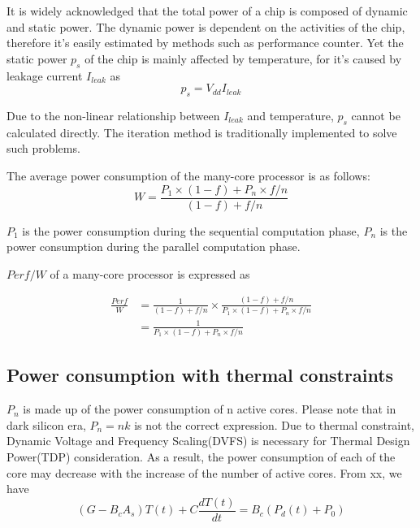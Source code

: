 It is widely acknowledged that the total power of a chip is composed of dynamic and 
static power. The dynamic power is dependent on the activities of the chip, therefore it's 
easily estimated by methods such as performance counter.
Yet the static power $p_{s}$ of the chip is mainly affected by temperature, for it's caused by
leakage current $I_{leak}$ as
\begin{equation}\label{ps}
p_{s} = V_{dd}I_{leak}
\end{equation}

Due to the non-linear relationship between $I_{leak}$ and temperature, $p_{s}$ cannot be
calculated directly. The iteration method is traditionally implemented to solve such problems.







The average power consumption of the many-core processor is as follows:
\begin{equation}\label{average_power}
W = \frac{P_{1} \times (1-f)+P_{n} \times f/n}{(1-f)+f/n}
\end{equation}

$P_{1}$ is the power consumption during the sequential computation phase, $P_{n}$ is the power 
consumption during the parallel computation phase. 

$Perf/W$ of a many-core processor is expressed as

\begin{equation}\label{ppw}
\begin{split}
\frac{Perf}{W} &= \frac{1}{(1-f)+f/n} \times \frac{(1-f)+f/n}{P_{1} \times (1-f)+P_{n} \times f/n}\\
&= \frac{1}{P_{1} \times (1-f)+P_{n} \times f/n}
\end{split}
\end{equation}


\subsection{Power consumption with thermal constraints}
$P_{n}$ is made up of the power consumption of n active cores. Please note that in dark silicon
era, $P_{n} = nk$ is not the correct expression. Due to thermal constraint, Dynamic Voltage and
Frequency Scaling(DVFS) is necessary for Thermal Design Power(TDP) consideration. As a result,
the power consumption of each of the core may decrease with the increase of the number of active cores.
From xx, we have
\begin{equation}\label{gt=bp}
(G - B_{c}A_{s})T(t) + C\frac{dT(t)}{dt}= B_{c}(P_{d}(t) + P_{0})
\end{equation}

